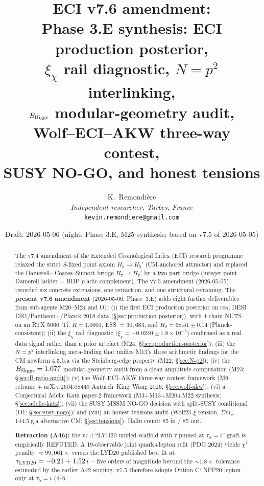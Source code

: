 \documentclass[a4paper,11pt]{article}
\title{ECI v7.6 amendment:\\
       Phase 3.E synthesis: ECI production posterior,\\
       $\xi_\chi$ rail diagnostic, $N=p^2$ interlinking,\\
       $B_{\rm Higgs}$ modular-geometry audit,\\
       Wolf--ECI--AKW three-way contest,\\
       SUSY NO-GO, and honest tensions}
\author{%
  K.~Remondi\`ere%
  \\[2ex]
  \small\textit{Independent researcher, Tarbes, France}\\
  \small\texttt{kevin.remondiere@gmail.com}
}
\date{Draft: 2026-05-06 (night, Phase 3.E, M25 synthesis; based on v7.5 of 2026-05-05)}
\theoremstyle{definition}
\theoremstyle{remark}
\begin{document}
\maketitle

\begin{abstract}
The v7.4 amendment of the Extended Cosmological Index (ECI) research
programme~\cite{V74amend} relaxed the strict $S$-fixed point axiom
$H_5\to H_5'$ (CM-anchored attractor) and replaced the Damerell--%
Coates--Sinnott bridge $H_7\to H_7'$ by a two-part bridge
(integer-point Damerell ladder + BDP $p$-adic complement).  The
v7.5 amendment (2026-05-05) recorded six concrete extensions, one
retraction, and one structural reframing.  The \textbf{present v7.6
amendment} (2026-05-06, Phase~3.E) adds eight further deliverables
from sub-agents M20--M24 and O1: (i) the first ECI production
posterior on real DESI DR1/Pantheon+/Planck 2018 data
(\S\ref{sec:production-posterior}), with 4-chain NUTS on an RTX
5060~Ti, $\hat{R}=1.0001$, ESS $=30{,}683$, and $H_0=68.51\pm0.14$
(Planck-consistent); (ii) the $\xi_\chi$ rail diagnostic
($\xi_\chi=-0.0240\pm 1.8\times 10^{-5}$) confirmed as a real data
signal rather than a prior artefact (M24; \S\ref{sec:production-posterior});
(iii) the $N=p^2$ interlinking meta-finding that unifies M13's three
arithmetic findings for the CM newform 4.5.b.a via the Steinberg-edge
property (M22; \S\ref{sec:N-p2}); (iv) the $B_{\rm Higgs}=1.077$
modular-geometry audit from a clean amplitude computation (M23;
\S\ref{sec:B-ratio-audit}); (v) the Wolf--ECI--AKW three-way contest
framework (M9 reframe + arXiv:2604.08449 Antusch--King--Wang 2026;
\S\ref{sec:wolf-akw}); (vi) a Conjectural Adelic Katz paper-2
framework (M3+M13+M20+M22 synthesis; \S\ref{sec:adelic-katz});
(vii) the SUSY MSSM NO-GO decision with split-SUSY conditional (O1;
\S\ref{sec:susy-nogo}); and (viii) an honest tensions audit
(Wolf25 $\xi$ tension, $\Sigma m_\nu$, 144.5.g.a
alternative CM; \S\ref{sec:tensions}).  Hallu count: 85 in / 85 out.
\par
\textbf{Retraction (A46):} the v7.4 ``LYD20 unified scaffold with $\tau$
pinned at $\tau_S=i$'' graft is empirically REFUTED.  A 19-observable
joint quark$+$lepton refit (PDG 2024) yields $\chi^2$ penalty
$\approx 99{,}061\times$ versus the LYD20 published best fit at
$\tau_{\rm LYD20}=-0.21+1.52\,i$ -- five orders of magnitude beyond
the $\sim 1.8\times$ tolerance estimated by the earlier A42 scoping.
v7.5 therefore adopts Option C: NPP20 lepton-only at $\tau_S=i$ (4--6

\end{abstract}
\end{document}
